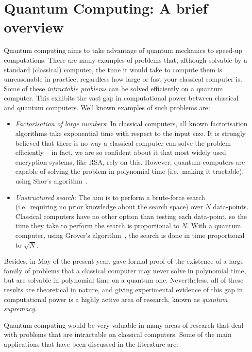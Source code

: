 \chapter{Quantum Computing: A brief overview}

Quantum computing aims to take advantage of quantum mechanics to speed-up computations. There are many examples of problems that, although solvable by a standard (classical) computer, the time it would take to compute them is unreasonable in practice, regardless how large or fast your classical computer is. Some of these \textit{intractable problems} can be solved efficiently on a quantum computer. This exhibits the vast gap in computational power between classical and quantum computers. Well known examples of such problems are:

\begin{itemize} 
\item \textit{Factorisation of large numbers}: In classical computers, all known factorisation algorithms take exponential time with respect to the input size. It is strongly believed that there is no way a classical computer can solve the problem efficiently -- in fact, we are so confident about it that most widely used encryption systems, like RSA, rely on this. However, quantum computers are capable of solving the problem in polynomial time (i.e.\ making it tractable), using Shor's algorithm~\citep{Shor}.
\item \textit{Unstructured search}: The aim is to perform a brute-force search (i.e.\ requiring no prior knowledge about the search space) over \(N\) data-points. Classical computers have no other option than testing each data-point, so the time they take to perform the search is proportional to \(N\). With a quantum computer, using Grover's algorithm~\citep{Grover}, the search is done in time proportional to \(\sqrt{N}\).
\end{itemize}

Besides, in May of the present year, \citet{BQPSepPH} gave formal proof of the existence of a large family of problems that a classical computer may never solve in polynomial time, but are solvable in polynomial time on a quantum one. Nevertheless, all of these results are theoretical in nature, and giving experimental evidence of this gap in computational power is a highly active area of research, known as \textit{quantum supremacy}. 

Quantum computing would be very valuable in many areas of research that deal with problems that are intractable on classical computers. Some of the main applications that have been discussed in the literature are:

